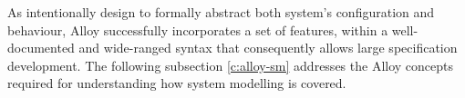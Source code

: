 As intentionally design to formally abstract both system's configuration and behaviour, Alloy successfully incorporates a set of features, within a well-documented and wide-ranged syntax that consequently allows large specification development. \cite{lwspecification} The following subsection \ref{c:alloy-sm} addresses the Alloy concepts required for understanding how system modelling is covered. 

% 
% 
% 

% 
% 


